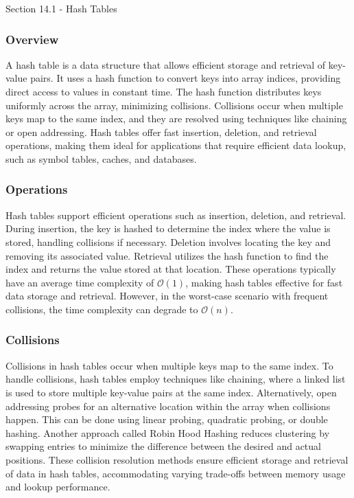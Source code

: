 \begin{notes}{Section 14.1 - Hash Tables}
    \subsubsection*{Overview}

    A hash table is a data structure that allows efficient storage and retrieval of key-value pairs. It uses a hash function to convert keys into array indices, providing direct access to values in constant 
    time. The hash function distributes keys uniformly across the array, minimizing collisions. Collisions occur when multiple keys map to the same index, and they are resolved using techniques like chaining 
    or open addressing. Hash tables offer fast insertion, deletion, and retrieval operations, making them ideal for applications that require efficient data lookup, such as symbol tables, caches, and databases.
    
    \subsubsection*{Operations}
    
    Hash tables support efficient operations such as insertion, deletion, and retrieval. During insertion, the key is hashed to determine the index where the value is stored, handling collisions if necessary. 
    Deletion involves locating the key and removing its associated value. Retrieval utilizes the hash function to find the index and returns the value stored at that location. These operations typically have an 
    average time complexity of $\mathcal{O}(1)$, making hash tables effective for fast data storage and retrieval. However, in the worst-case scenario with frequent collisions, the time complexity can degrade to 
    $\mathcal{O}(n)$.
    
    \subsubsection*{Collisions}
    
    Collisions in hash tables occur when multiple keys map to the same index. To handle collisions, hash tables employ techniques like chaining, where a linked list is used to store multiple key-value pairs at 
    the same index. Alternatively, open addressing probes for an alternative location within the array when collisions happen. This can be done using linear probing, quadratic probing, or double hashing. Another 
    approach called Robin Hood Hashing reduces clustering by swapping entries to minimize the difference between the desired and actual positions. These collision resolution methods ensure efficient storage and 
    retrieval of data in hash tables, accommodating varying trade-offs between memory usage and lookup performance.
\end{notes}

